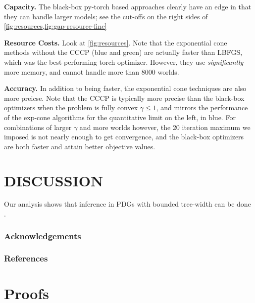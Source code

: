 \documentclass[twoside]{article}
\begin{document}
\textbf{Capacity.} 
The black-box py-torch based approaches clearly have an edge in that they can handle larger models; see the cut-offs on the right sides of \cref{fig:resources,fig:gap-resource-fine}

\textbf{Resource Costs.} 
Look at \cref{fig:resources}. 
Note that the exponential cone methods without the CCCP (blue and green) are actually faster than LBFGS, which was the best-performing torch optimizer. 
However, they use \emph{significantly} more memory, and cannot handle more than 8000 worlds. 


\textbf{Accuracy.}
In addition to being faster, the exponential cone techniques are also more preicse.
Note that the CCCP is typically more precise than the black-box optimizers when the problem is fully convex $\gamma \le 1$, and mirrors the performance of the exp-cone algorithms for the quantitative limit on the left, in blue.  For combinations of larger $\gamma$ and more worlds however, the 20 iteration maximum we imposed is not nearly enough to get convergence, and the black-box optimizers are both faster and attain better objective values.

\section{DISCUSSION}

Our analysis shows that inference in PDGs with bounded tree-width can be done .




\subsubsection*{Acknowledgements}

\subsubsection*{References}
\printbibliography


\clearpage
\onecolumn
\appendix
\section{Proofs}
\end{document}
